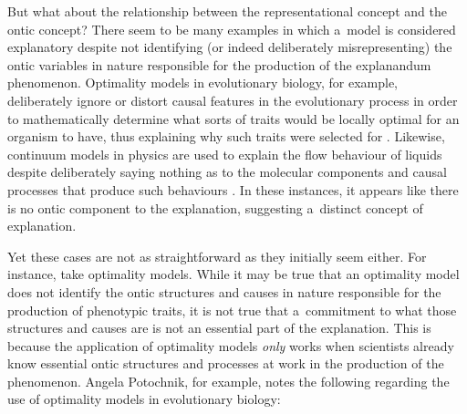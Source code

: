 But what about the relationship between the representational concept and the ontic concept? There seem to be many examples in which a~model is considered explanatory despite not identifying (or indeed deliberately misrepresenting) the ontic variables in nature responsible for the production of the explanandum phenomenon. Optimality models in evolutionary biology, for example, deliberately ignore or distort causal features in the evolutionary process in order to mathematically determine what sorts of traits would be locally optimal for an organism to have, thus explaining why such traits were selected for
\parencites[][]{potochnik_explanatory_2010}[][]{woods_virtuous_2010}[][]{rice_moving_2015}. %
 Likewise, continuum models in physics are used to explain the flow behaviour of liquids despite deliberately saying nothing as to the molecular components and causal processes that produce such behaviours 
\parencites[][]{batterman_minimal_2014}[][]{izadi_building_2014}[][p.803]{bokulich_representing_2018}. %
 In these instances, it appears like there is no ontic component to the explanation, suggesting a~distinct concept of explanation.

Yet these cases are not as straightforward as they initially seem either. For instance, take optimality models. While it may be true that an optimality model does not identify the ontic structures and causes in nature responsible for the production of phenotypic traits, it is not true that a~commitment to what those structures and causes are is not an essential part of the explanation. This is because the application of optimality models \textit{only} works when scientists already know essential ontic structures and processes at work in the production of the phenomenon. Angela Potochnik, for example, notes the following regarding the use of optimality models in evolutionary biology:


